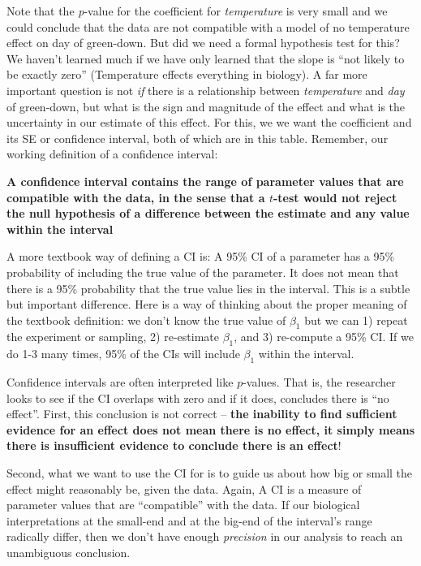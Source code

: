 \documentclass[]{book}
\begin{document}
Note that the \emph{p}-value for the coefficient for \emph{temperature} is very small and we could conclude that the data are not compatible with a model of no temperature effect on day of green-down. But did we need a formal hypothesis test for this? We haven't learned much if we have only learned that the slope is ``not likely to be exactly zero'' (Temperature effects everything in biology). A far more important question is not \emph{if} there is a relationship between \emph{temperature} and \emph{day} of green-down, but what is the sign and magnitude of the effect and what is the uncertainty in our estimate of this effect. For this, we we want the coefficient and its SE or confidence interval, both of which are in this table. Remember, our working definition of a confidence interval:

\textbf{A confidence interval contains the range of parameter values that are compatible with the data, in the sense that a \(t\)-test would not reject the null hypothesis of a difference between the estimate and any value within the interval}

A more textbook way of defining a CI is: A 95\% CI of a parameter has a 95\% probability of including the true value of the parameter. It does not mean that there is a 95\% probability that the true value lies in the interval. This is a subtle but important difference. Here is a way of thinking about the proper meaning of the textbook definition: we don't know the true value of \(\beta_1\) but we can 1) repeat the experiment or sampling, 2) re-estimate \(\beta_1\), and 3) re-compute a 95\% CI. If we do 1-3 many times, 95\% of the CIs will include \(\beta_1\) within the interval.

Confidence intervals are often interpreted like \(p\)-values. That is, the researcher looks to see if the CI overlaps with zero and if it does, concludes there is ``no effect''. First, this conclusion is not correct -- \textbf{the inability to find sufficient evidence for an effect does not mean there is no effect, it simply means there is insufficient evidence to conclude there is an effect}!

Second, what we want to use the CI for is to guide us about how big or small the effect might reasonably be, given the data. Again, A CI is a measure of parameter values that are ``compatible'' with the data. If our biological interpretations at the small-end and at the big-end of the interval's range radically differ, then we don't have enough \emph{precision} in our analysis to reach an unambiguous conclusion.
\end{document}
